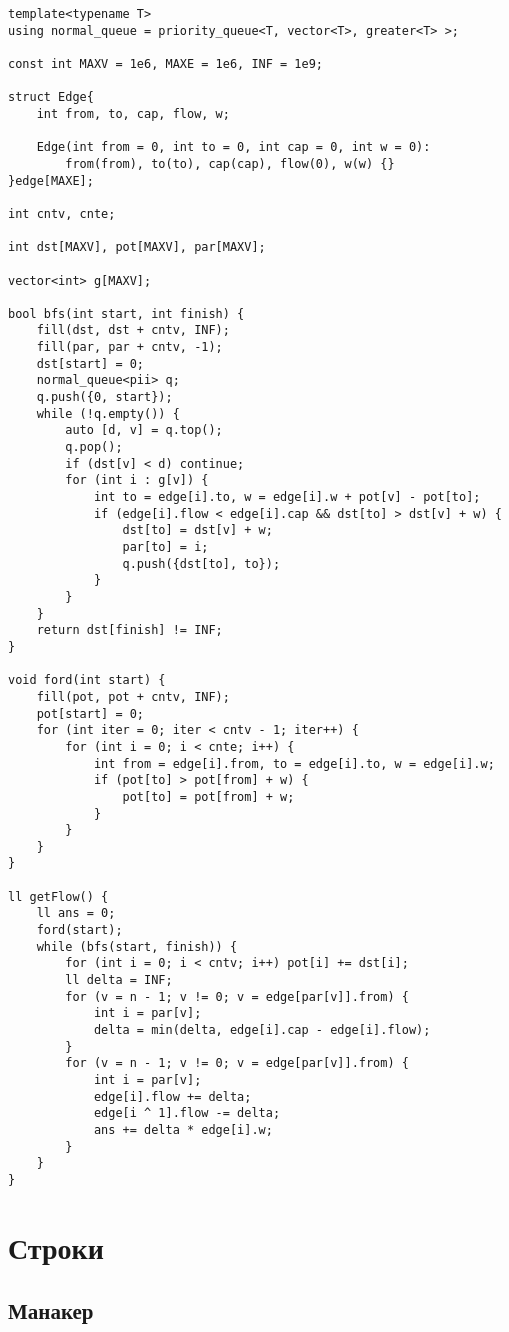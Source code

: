 \documentclass{article}
\begin{document}
    \begin{verbatim}
template<typename T>
using normal_queue = priority_queue<T, vector<T>, greater<T> >;

const int MAXV = 1e6, MAXE = 1e6, INF = 1e9;

struct Edge{
    int from, to, cap, flow, w;

    Edge(int from = 0, int to = 0, int cap = 0, int w = 0):
        from(from), to(to), cap(cap), flow(0), w(w) {}
}edge[MAXE];

int cntv, cnte;

int dst[MAXV], pot[MAXV], par[MAXV];

vector<int> g[MAXV];

bool bfs(int start, int finish) {
    fill(dst, dst + cntv, INF);
    fill(par, par + cntv, -1);
    dst[start] = 0;
    normal_queue<pii> q;
    q.push({0, start});
    while (!q.empty()) {
        auto [d, v] = q.top();
        q.pop();
        if (dst[v] < d) continue;
        for (int i : g[v]) {
            int to = edge[i].to, w = edge[i].w + pot[v] - pot[to];
            if (edge[i].flow < edge[i].cap && dst[to] > dst[v] + w) {
                dst[to] = dst[v] + w;
                par[to] = i;
                q.push({dst[to], to});
            }
        }
    }
    return dst[finish] != INF;
}

void ford(int start) {
    fill(pot, pot + cntv, INF);
    pot[start] = 0;
    for (int iter = 0; iter < cntv - 1; iter++) {
        for (int i = 0; i < cnte; i++) {
            int from = edge[i].from, to = edge[i].to, w = edge[i].w;
            if (pot[to] > pot[from] + w) {
                pot[to] = pot[from] + w;
            }
        }
    }
}

ll getFlow() {
    ll ans = 0;
    ford(start);
    while (bfs(start, finish)) {
        for (int i = 0; i < cntv; i++) pot[i] += dst[i];
        ll delta = INF;
        for (v = n - 1; v != 0; v = edge[par[v]].from) {
            int i = par[v];
            delta = min(delta, edge[i].cap - edge[i].flow);
        }
        for (v = n - 1; v != 0; v = edge[par[v]].from) {
            int i = par[v];
            edge[i].flow += delta;
            edge[i ^ 1].flow -= delta;
            ans += delta * edge[i].w;
        }
    }
}
    \end{verbatim}   
    
    \section*{Строки}
    \subsection{Манакер}
    
\end{document}
